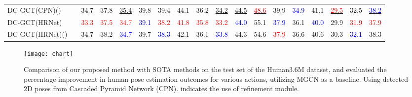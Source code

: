 \documentclass[journal]{IEEEtran}
\begin{document}
\begin{table*}[htbp]
{\begin{tabular}{lr|ccccccccccccccc|c}
DC-GCT(CPN)()  &            &34.7 &37.8 &\underline{35.4} &39.8 &39.4 &44.1 &36.2 &\underline{34.2} &\underline{44.5} &\underline{ \textcolor{red}{48.6}} &39.9 &\textcolor{blue}{34.9} &41.1 &\underline{ \textcolor{red}{29.5}} &32.5 &\underline{ \textcolor{blue}{38.2}} \\

DC-GCT(HRNet) &                        &\textcolor{red}{33.3}  &\textcolor{red}{37.5}  &\textcolor{red}{34.7}  &\textcolor{blue}{39.1}  &\textcolor{red}{38.2}  &\textcolor{red}{41.8}  &\textcolor{red}{35.8}  &\textcolor{red}{33.2}  &\textcolor{blue}{44.0}  &55.1  &\textcolor{blue}{37.9}  &36.1  &\textcolor{blue}{40.0}  &29.9  &\textcolor{red}{31.9}  &\textcolor{red}{37.9}  \\
DC-GCT(HRNet)()  &            &34.7 &38.2 &\textcolor{blue}{34.7} &39.7 &\textcolor{blue}{38.3} &42.1 &36.1 &\textcolor{blue}{33.8} &44.3 &54.6 &\textcolor{red}{37.9} &36.6 &40.6 &30.3 &\textcolor{blue}{32.1} &38.3 \\
\bottomrule[1mm]

\end{tabular}
}
\end{table*}


\begin{figure}[t]
\centering
\texttt{[image: chart]}
\caption{Comparison of our proposed method with SOTA methods \cite{zou2021modulated,cai2023htnet} on the test set of the Human3.6M dataset, and evaluated the percentage improvement in human pose estimation outcomes for various actions, utilizing MGCN \cite{zou2021modulated} as a baseline. Using detected 2D poses from Cascaded Pyramid Network (CPN)\cite{chen2018cascaded}.  indicates the use of refinement module.}
\label{fig:chart}
\end{figure}
\end{document}
